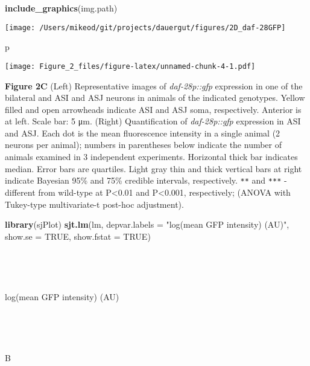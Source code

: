 \documentclass[]{article}
\newenvironment{Shaded}{\begin{snugshade}}{\end{snugshade}}
\newcommand{\KeywordTok}[1]{\textcolor[rgb]{0.13,0.29,0.53}{\textbf{#1}}}
\newcommand{\DataTypeTok}[1]{\textcolor[rgb]{0.13,0.29,0.53}{#1}}
\newcommand{\StringTok}[1]{\textcolor[rgb]{0.31,0.60,0.02}{#1}}
\newcommand{\OtherTok}[1]{\textcolor[rgb]{0.56,0.35,0.01}{#1}}
\newcommand{\NormalTok}[1]{#1}
\begin{document}
\begin{Shaded}
\begin{Highlighting}[]
\KeywordTok{include_graphics}\NormalTok{(img.path)                            }
\end{Highlighting}
\end{Shaded}

\texttt{[image: /Users/mikeod/git/projects/dauergut/figures/2D\_daf-28GFP]}

\begin{Shaded}
\begin{Highlighting}[]
\NormalTok{p}
\end{Highlighting}
\end{Shaded}

\texttt{[image: Figure\_2\_files/figure-latex/unnamed-chunk-4-1.pdf]}

\textbf{Figure 2C} (Left) Representative images of \emph{daf-28p::gfp}
expression in one of the bilateral and ASI and ASJ neurons in animals of
the indicated genotypes. Yellow filled and open arrowheads indicate ASI
and ASJ soma, respectively. Anterior is at left. Scale bar: 5 μm.
(Right) Quantification of \emph{daf-28p::gfp} expression in ASI and ASJ.
Each dot is the mean fluorescence intensity in a single animal (2
neurons per animal); numbers in parentheses below indicate the number of
animals examined in 3 independent experiments. Horizontal thick bar
indicates median. Error bars are quartiles. Light gray thin and thick
vertical bars at right indicate Bayesian 95\% and 75\% credible
intervals, respectively. {\texttt{**}} and {\texttt{***}} - different
from wild-type at P\textless{}0.01 and P\textless{}0.001, respectively;
(ANOVA with Tukey-type multivariate-t post-hoc adjustment).

\begin{Shaded}
\begin{Highlighting}[]
\KeywordTok{library}\NormalTok{(sjPlot)}
\KeywordTok{sjt.lm}\NormalTok{(lm, }\DataTypeTok{depvar.labels =} \StringTok{"log(mean GFP intensity) (AU)"}\NormalTok{, }\DataTypeTok{show.se =} \OtherTok{TRUE}\NormalTok{, }\DataTypeTok{show.fstat =} \OtherTok{TRUE}\NormalTok{)}
\end{Highlighting}
\end{Shaded}

~

~

log(mean GFP intensity) (AU)

~

~

B
\end{document}
